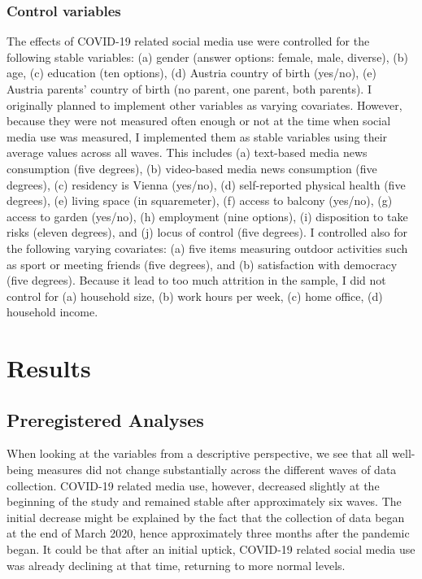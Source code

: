 \documentclass[
  english,
  man,mask,floatsintext]{apa6}
\begin{document}
\hypertarget{control-variables}{%
\subsubsection{Control variables}\label{control-variables}}

The effects of COVID-19 related social media use were controlled for the following stable variables:
(a) gender (answer options: female, male, diverse), (b) age, (c) education (ten options), (d) Austria country of birth (yes/no), (e) Austria parents' country of birth (no parent, one parent, both parents).
I originally planned to implement other variables as varying covariates.
However, because they were not measured often enough or not at the time when social media use was measured, I implemented them as stable variables using their average values across all waves.
This includes (a) text-based media news consumption (five degrees), (b) video-based media news consumption (five degrees), (c) residency is Vienna (yes/no), (d) self-reported physical health (five degrees), (e) living space (in squaremeter), (f) access to balcony (yes/no), (g) access to garden (yes/no), (h) employment (nine options), (i) disposition to take risks (eleven degrees), and (j) locus of control (five degrees).
I controlled also for the following varying covariates: (a) five items measuring outdoor activities such as sport or meeting friends (five degrees), and (b) satisfaction with democracy (five degrees).
Because it lead to too much attrition in the sample, I did not control for (a) household size, (b) work hours per week, (c) home office, (d) household income.

\hypertarget{results}{%
\section{Results}\label{results}}

\hypertarget{preregistered-analyses}{%
\subsection{Preregistered Analyses}\label{preregistered-analyses}}

When looking at the variables from a descriptive perspective, we see that all well-being measures did not change substantially across the different waves of data collection.
COVID-19 related media use, however, decreased slightly at the beginning of the study and remained stable after approximately six waves.
The initial decrease might be explained by the fact that the collection of data began at the end of March 2020, hence approximately three months after the pandemic began.
It could be that after an initial uptick, COVID-19 related social media use was already declining at that time, returning to more normal levels.
\end{document}
